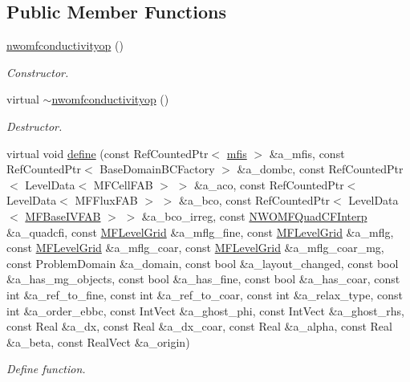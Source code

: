 \subsection*{Public Member Functions}
\begin{DoxyCompactItemize}
\item 
\hyperlink{classnwomfconductivityop_a070eb87e79a413a7d49be5360cbc3a27}{nwomfconductivityop} ()
\begin{DoxyCompactList}\small\item\em Constructor. \end{DoxyCompactList}\item 
virtual \hyperlink{classnwomfconductivityop_af1436fb06078087cd228c14728d0ecd6}{$\sim$nwomfconductivityop} ()
\begin{DoxyCompactList}\small\item\em Destructor. \end{DoxyCompactList}\item 
virtual void \hyperlink{classnwomfconductivityop_a3286b4c191b38e71527af64aaf40f612}{define} (const Ref\+Counted\+Ptr$<$ \hyperlink{classmfis}{mfis} $>$ \&a\+\_\+mfis, const Ref\+Counted\+Ptr$<$ Base\+Domain\+B\+C\+Factory $>$ \&a\+\_\+dombc, const Ref\+Counted\+Ptr$<$ Level\+Data$<$ M\+F\+Cell\+F\+AB $>$ $>$ \&a\+\_\+aco, const Ref\+Counted\+Ptr$<$ Level\+Data$<$ M\+F\+Flux\+F\+AB $>$ $>$ \&a\+\_\+bco, const Ref\+Counted\+Ptr$<$ Level\+Data$<$ \hyperlink{classMFBaseIVFAB}{M\+F\+Base\+I\+V\+F\+AB} $>$ $>$ \&a\+\_\+bco\+\_\+irreg, const \hyperlink{classNWOMFQuadCFInterp}{N\+W\+O\+M\+F\+Quad\+C\+F\+Interp} \&a\+\_\+quadcfi, const \hyperlink{classMFLevelGrid}{M\+F\+Level\+Grid} \&a\+\_\+mflg\+\_\+fine, const \hyperlink{classMFLevelGrid}{M\+F\+Level\+Grid} \&a\+\_\+mflg, const \hyperlink{classMFLevelGrid}{M\+F\+Level\+Grid} \&a\+\_\+mflg\+\_\+coar, const \hyperlink{classMFLevelGrid}{M\+F\+Level\+Grid} \&a\+\_\+mflg\+\_\+coar\+\_\+mg, const Problem\+Domain \&a\+\_\+domain, const bool \&a\+\_\+layout\+\_\+changed, const bool \&a\+\_\+has\+\_\+mg\+\_\+objects, const bool \&a\+\_\+has\+\_\+fine, const bool \&a\+\_\+has\+\_\+coar, const int \&a\+\_\+ref\+\_\+to\+\_\+fine, const int \&a\+\_\+ref\+\_\+to\+\_\+coar, const int \&a\+\_\+relax\+\_\+type, const int \&a\+\_\+order\+\_\+ebbc, const Int\+Vect \&a\+\_\+ghost\+\_\+phi, const Int\+Vect \&a\+\_\+ghost\+\_\+rhs, const Real \&a\+\_\+dx, const Real \&a\+\_\+dx\+\_\+coar, const Real \&a\+\_\+alpha, const Real \&a\+\_\+beta, const Real\+Vect \&a\+\_\+origin)
\begin{DoxyCompactList}\small\item\em Define function. \end{DoxyCompactList}\item 

\end{DoxyCompactItemize}

